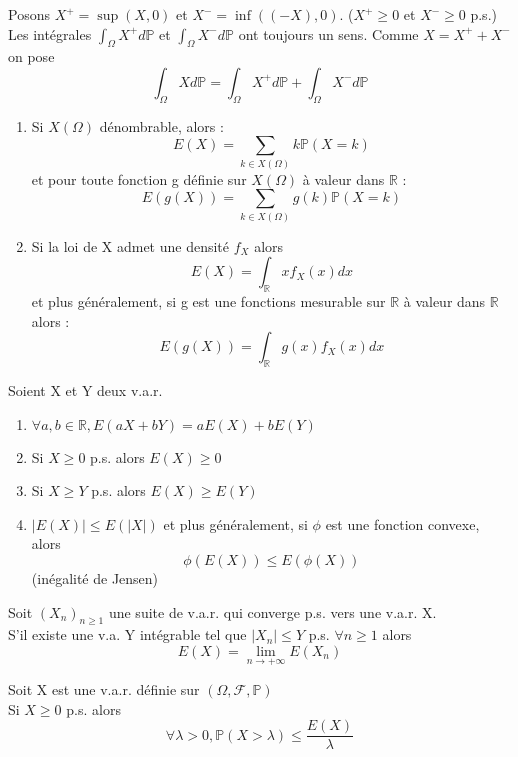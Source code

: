 \begin{rmq}
Posons $X^+=\sup(X,0)$ et $X^-=\inf((-X),0)$. ($X^+ \geq 0$ et $X^- \geq 0$ p.s.) \\
Les intégrales $\int_{\Omega} X^+ d\mathbb{P}$ et $\int_{\Omega} X^- d\mathbb{P}$ ont toujours un sens.
Comme $X=X^+ + X^-$ on pose \[\int_{\Omega} X d\mathbb{P} = \int_{\Omega} X^+ d\mathbb{P} + \int_{\Omega} X^- d\mathbb{P}\]
\end{rmq}

\begin{theo}
\begin{enumerate}
\item Si $X(\Omega)$ dénombrable, alors : \[E(X) = \sum_{k\in X(\Omega)} k \mathbb{P}(X=k)\] et pour toute fonction g définie sur $X(\Omega)$ à valeur dans $\mathbb{R}$ : 
\[E(g(X))=\sum_{k\in X(\Omega)} g(k) \mathbb{P}(X=k)\]
\item Si la loi de X admet une densité $f_X$ alors \[E(X)=\int_{\mathbb{R}} xf_X(x)dx\] et plus généralement, si g est une fonctions mesurable sur $\mathbb{R}$ à valeur dans $\mathbb{R}$ alors : \[E(g(X))=\int_{\mathbb{R}} g(x) f_X(x) dx\]
\end{enumerate}
\end{theo}

\begin{Prop}
Soient X et Y deux v.a.r.
\begin{enumerate}
\item $\forall a,b\in \mathbb{R}, E(aX+bY)=aE(X)+bE(Y)$
\item Si $X\geq 0$ p.s. alors $E(X) \geq 0$
\item Si $X \geq Y$ p.s. alors $E(X) \geq E(Y)$
\item $|E(X)| \leq E(|X|)$ et plus généralement, si $\phi$ est une fonction convexe, alors \[\phi(E(X)) \leq E(\phi(X))\] (inégalité de Jensen)
\end{enumerate}
\end{Prop}

\begin{theo}
Soit $(X_n)_{n\geq 1}$ une suite de v.a.r. qui converge p.s. vers une v.a.r. X.\\
S'il existe une v.a. Y intégrable tel que $|X_n| \leq Y$ p.s. $\forall n\geq 1$ alors \[E(X) = \lim_{n \to +\infty} E(X_n)\]
\end{theo}

\begin{Prop}
Soit X est une v.a.r. définie sur $(\Omega,\mathcal{F},\mathbb{P})$ \\
Si $X \geq 0$ p.s. alors \[\forall \lambda > 0,  \mathbb{P}(X > \lambda) \leq \frac{E(X)}{\lambda}\]
\end{Prop}

